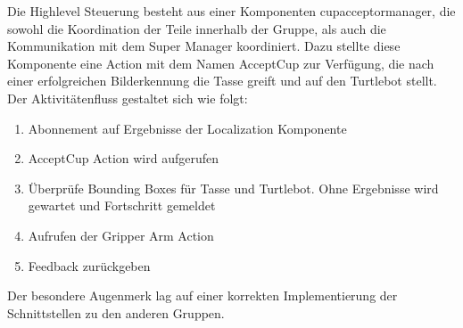 Die Highlevel Steuerung besteht aus einer Komponenten \glqq cup\textunderscore acceptor\textunderscore manager\grqq, die sowohl die Koordination der Teile innerhalb der Gruppe, als auch die Kommunikation mit dem Super Manager koordiniert. Dazu stellte diese Komponente eine Action mit dem Namen AcceptCup zur Verfügung, die nach einer erfolgreichen Bilderkennung die Tasse greift und auf den Turtlebot stellt. Der Aktivitätenfluss gestaltet sich wie folgt:
\begin{enumerate}
\item Abonnement auf Ergebnisse der Localization Komponente
\item AcceptCup Action wird aufgerufen
\item Überprüfe Bounding Boxes für Tasse und Turtlebot. Ohne Ergebnisse wird gewartet und Fortschritt gemeldet
\item Aufrufen der Gripper Arm Action

\item Feedback zurückgeben
\end{enumerate}

Der besondere Augenmerk lag auf einer korrekten Implementierung der Schnittstellen zu den anderen Gruppen.

